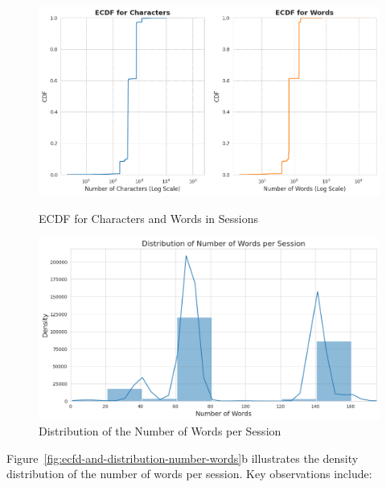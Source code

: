         \begin{figure}[h]
            \centering
            \begin{minipage}[c]{0.47\textwidth}
                \centering
                \includegraphics[width=\textwidth]{../figures/plots/section1/ecdf_for_characters_and_for_words.png}
                \caption{ECDF for Characters and Words in Sessions}
                \label{fig:ecdf_sessions}
            \end{minipage}
            \hfill
            \begin{minipage}[c]{0.47\textwidth}
                \centering
                \includegraphics[width=\textwidth]{../figures/plots/section1/distribution_of_number_of_words_per_session_limited.png}
                \caption{Distribution of the Number of Words per Session}
                \label{fig:word_distribution}
            \end{minipage}
        \end{figure}
        
        \vspace{-0.3cm}

        Figure~\ref{fig:ecfd-and-distribution-number-words}b illustrates the density distribution of the number of words per session. Key observations include:
        
